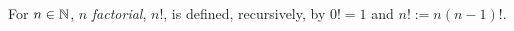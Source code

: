 \guard

\begin{defn}
\label{defn:factorial}
  For $n\in\mathbb{N}$, $n$ \emph{factorial}, $n!$, is defined, recursively, by $0!=1$ and $n!:=n(n-1)!$.
\end{defn}
